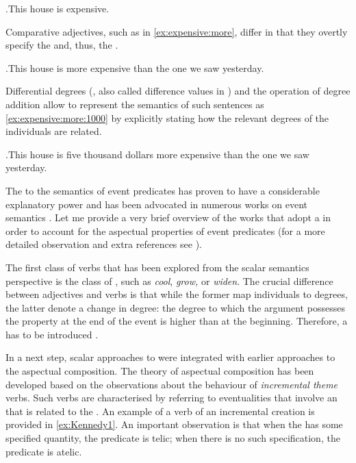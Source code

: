  \ex.\label{ex:expensive}This house is expensive.

Comparative adjectives, such as in \ref{ex:expensive:more}, differ in that they overtly specify the  and, thus, the . 

 \ex.\label{ex:expensive:more}This house is more expensive than the one we saw yesterday.
 
Differential degrees (\citealt{Kennedy:01}, also called difference values in \citealt{KennedyLevin:02}) and the operation of degree addition \citep{KennedyLevin:02} allow to represent the semantics of such sentences as \ref{ex:expensive:more:1000} by explicitly stating how the relevant degrees of the individuals are related.
 
 \ex.\label{ex:expensive:more:1000}This house is five thousand dollars more expensive than the one we saw yesterday.

The  to the semantics of event predicates has proven to have a considerable explanatory power and has been advocated in numerous works on event semantics \citep[see, e.g.,][]{Ramchand:97, Hay:99, KennedyLevin:02, CaudalNicolas:05, FilipRothstein:05, Kearns:07, KennedyLevin:08, Filip:08, Pinon:08, Rappaport:08, Rappaport:11, McNally:11}. Let me provide a very brief overview of the works that adopt a  in order to account for the aspectual properties of event predicates (for a more detailed observation and extra references see \citealt{Arsenijevic:13}).

The first class of verbs that has been explored from the scalar semantics perspective is the class of , such as \textit{cool}, \textit{grow,} or \textit{widen}. The crucial difference between adjectives and  verbs is that while the former map individuals to degrees, the latter denote a change in degree: the degree to which the argument possesses the property at the end of the event is higher than at the beginning. Therefore, a  has to be introduced \citep{Hay:99, KennedyLevin:02}.


In a next step, scalar approaches to  were integrated with earlier approaches to the aspectual composition. The theory of aspectual composition has been developed based on the observations about the behaviour of \textit{incremental theme} verbs. Such verbs are characterised by referring to eventualities that involve an  that is related to the  \citep[see][]{Garey:57, Wierzbicka:67, Verkuyl:72, Krifka:86, Krifka:92, Filip:92, Filip:99}. An example of a verb of an incremental creation is provided in \ref{ex:Kennedy1}. An important observation is that when the  has some specified quantity, the predicate is telic; when there is no such specification, the predicate is atelic.

